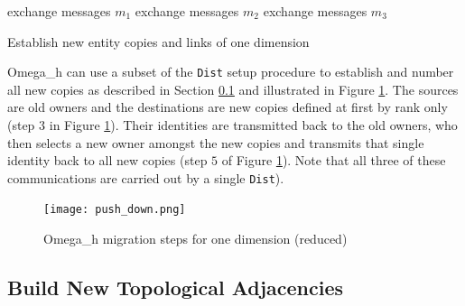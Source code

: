 \begin{algorithm}
  exchange messages $m_1$\;
  exchange messages $m_2$\;
  exchange messages $m_3$\;
  \caption{Establish new entity copies and links of one dimension}
  \label{alg:new_links}
\end{algorithm}

Omega\_h can use a subset of the \texttt{Dist} setup procedure
to establish and number all new copies as described in Section
\ref{sec:migr_topo} and illustrated in Figure \ref{fig:push_down}.
The sources are old owners and the destinations are
new copies defined at first by rank only (step $3$ in Figure \ref{fig:push_down}).
Their identities are transmitted back to the old owners, who then
selects a new owner amongst the new copies and transmits that single
identity back to all new copies (step $5$ of Figure \ref{fig:push_down}).
Note that all three of these
communications are carried out by a single \texttt{Dist}).

\begin{figure}[t]\vspace*{4pt}
\centerline{\texttt{[image: push\_down.png]}}
\caption{Omega\_h migration steps for one dimension (reduced)}\vspace*{-6pt}
\label{fig:push_down}
\end{figure}

\subsection{Build New Topological Adjacencies}
\label{sec:migr_topo}

